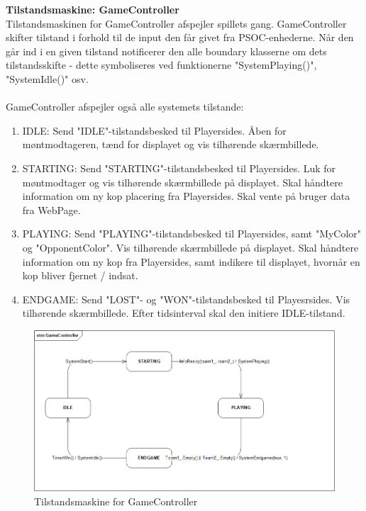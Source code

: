 \documentclass[Arkitektur/System_main.tex]{subfiles}
\begin{document}
\textbf{Tilstandsmaskine: GameController}\\
Tilstandsmaskinen for GameController afspejler spillets gang. GameController skifter tilstand i forhold til de input den får givet fra PSOC-enhederne. Når den går ind i en given tilstand notificerer den alle boundary klasserne om dets tilstandsskifte - dette symboliseres ved funktionerne "SystemPlaying()", "SystemIdle()" osv. \\\\
GameController afspejler også alle systemets tilstande:
\begin{enumerate}
    \item IDLE: Send "IDLE"-tilstandsbesked til Playersides. Åben for møntmodtageren, tænd for displayet og vis tilhørende skærmbillede. 
    \item STARTING: Send "STARTING"-tilstandsbesked til Playersides. Luk for møntmodtager og vis tilhørende skærmbillede på displayet. Skal håndtere information om ny kop placering fra Playersides. Skal vente på bruger data fra WebPage. 
    \item PLAYING: Send "PLAYING"-tilstandsbesked til Playersides, samt "MyColor" og "OpponentColor". Vis tilhørende skærmbillede på displayet. Skal håndtere information om ny kop fra Playersides, samt indikere til displayet, hvornår en kop bliver fjernet / indsat. 
    \item ENDGAME: Send "LOST"- og "WON"-tilstandsbesked til Playesrsides. Vis tilhørende skærmbillede. Efter tidsinterval skal den initiere IDLE-tilstand. 
\end{enumerate}
\begin{figure}[H]
    \centering
    \includegraphics[width=\textwidth]{Arkitektur/Softwarearkitektur/Applikationsmodel/RPi/graphics_RPi/Stm_Game.png}
    \caption{Tilstandsmaskine for GameController}
    \label{fig:stm_Game}
\end{figure}
\end{document}
